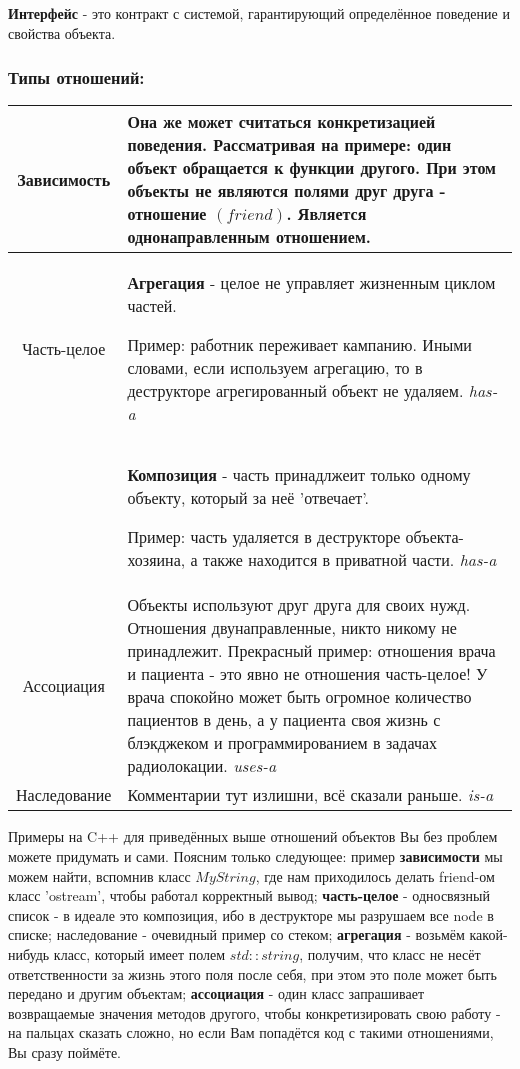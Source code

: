 \begin{definition}
    \textbf{Интерфейс} - это контракт с системой, гарантирующий определённое поведение и свойства объекта.
\end{definition}

\subsubsection{Типы отношений:}
\begin{tabular}{|c|p{15cm}|}
\hline
     Зависимость& Она же может считаться конкретизацией поведения.
     Рассматривая на примере: один объект обращается к функции другого.
     При этом объекты \textbf{не являются полями друг друга}
     - отношение $(friend)$. Является однонаправленным отношением.
     \\
\hline
     Часть-целое& \begin{definition}
         \textbf{Агрегация} - целое не управляет жизненным циклом частей.
     \end{definition}
     Пример: работник переживает кампанию. Иными словами, если используем агрегацию, то в деструкторе агрегированный объект не удаляем. \textit{has-a}\\
     \cline{2-2}
     & \begin{definition}
         \textbf{Композиция} - часть принадлжеит только одному объекту, который за неё 'отвечает'.
     \end{definition} Пример: часть удаляется в деструкторе объекта-хозяина, а также находится в приватной части. \textit{has-a}\\
\hline
     Ассоциация& Объекты используют друг друга для своих нужд. Отношения двунаправленные, никто никому не принадлежит. Прекрасный пример: отношения врача и пациента - это явно не отношения часть-целое! У врача спокойно может быть огромное количество пациентов в день, а у пациента своя жизнь с блэкджеком и программированием в задачах радиолокации. \textit{uses-a}\\
\hline
     Наследование& Комментарии тут излишни, всё сказали раньше. \textit{is-a} \\
\hline
\end{tabular}
\begin{notice}
    Примеры на C++ для приведённых выше отношений объектов Вы без проблем можете придумать и сами. Поясним только следующее: пример \textbf{зависимости} мы можем найти, вспомнив класс $MyString$, где нам приходилось делать friend-ом класс 'ostream', чтобы работал корректный вывод; \textbf{часть-целое} - односвязный список - в идеале это композиция, ибо в деструкторе мы разрушаем все node в списке; наследование - очевидный пример со стеком; \textbf{агрегация} - возьмём какой-нибудь класс, который имеет полем $std::string$, получим, что класс не несёт ответственности за жизнь этого поля после себя, при этом это поле может быть передано и другим объектам; \textbf{ассоциация} - один класс запрашивает возвращаемые значения методов другого, чтобы конкретизировать свою работу - на пальцах сказать сложно, но если Вам попадётся код с такими отношениями, Вы сразу поймёте.
\end{notice}
